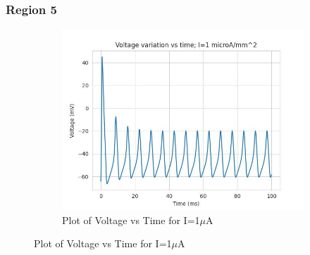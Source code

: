 \documentclass{article}
\begin{document}
\subsubsection{Region 5}

\begin{figure}[h]
    \centering
    \begin{subfigure}[b]{0.45\textwidth}
        \includegraphics[width=1.5\textwidth]{13.jpg}
        \caption{Plot of Voltage vs Time for I=1$\mu$A}
        \label{fig:IOU1}
    \end{subfigure}
    

\end{figure}
\end{document}

